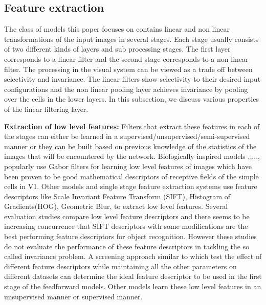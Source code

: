 \documentclass[12pt,twoside]{article}
\theoremstyle{plain}
\theoremstyle{definition}
\theoremstyle{remark}
\begin{document}
\subsection{Feature extraction}
\label{Subsec: Feature}
The class of models this paper focuses on contains linear and non linear transformations of the input images in several stages. Each stage usually consists of two different kinds of layers and sub processing stages. The first layer corresponds to a linear filter and the second stage corresponds to a non linear filter. The processing in the visual system can be viewed as a trade off between selectivity and invariance. The linear filters show selectivity to their desired input configurations and the non linear pooling layer achieves invariance by pooling over the cells in the lower layers. In this subsection, we discuss various properties of the linear filtering layer.

\textbf{Extraction of low level features:}
Filters that extract these features in each of the stages can either be learned in a supervised/unsupervised/semi-supervised manner or they can be built based on previous knowledge of the statistics of the images that will be encountered by the network. Biologically inspired models \cite{Fukushim1980},\cite{JimMutch2008},\cite{MaximilianRiesenhuber1999},\cite{NicolasPinto2008},\cite{ThomasSerre2007},\cite{MarkusLessmann2014},\cite{XiaolinHu2014} popularly use Gabor filters\cite{Gabor1946} for learning low level features of images which have been proven to be good mathematical descriptors of receptive fields of the simple cells in V1\cite{JPJones1987}. Other models\cite{K.Kavukcuoglu2009} and single stage feature extraction systems use feature descriptors like Scale Invariant Feature Transform (SIFT)\cite{Lowe2004}, Histogram of Gradients(HOG), Geometric Blur\cite{BergA.C2001},\cite{HaoZhang2006} \cite{NavneetDalal2005} to extract low level features. Several evaluation studies\cite{Mikolajczyk2005} compare low level feature descriptors and there seems to be increasing concurrence that SIFT\cite{Lowe2004} descriptors with some modifications are the best performing feature descriptors for object recognition. However these studies do not evaluate\cite{NicolasPinto2011} the performance of these feature descriptors in tackling the so called invariance problem\cite{NicolasPinto2008}. A screening approach similar to \cite{NicolasPinto2009} which test the effect of different feature descriptors while maintaining all the other parameters on different datasets can determine the ideal feature descriptor to be used in the first stage of the feedforward models. Other models\cite{K.Kavukcuoglu2009} learn these low level features in an unsupervised manner or supervised manner. 
\end{document}
